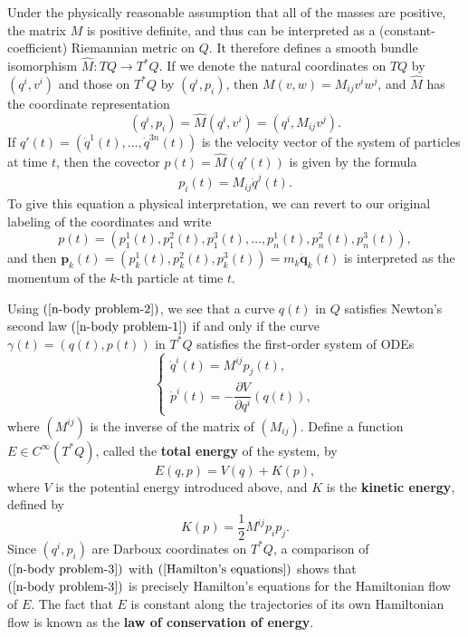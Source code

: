 \begin{example}
Under the physically reasonable assumption that all of the masses are positive, the matrix $M$ is positive definite, and thus can be interpreted as a (constant-coefficient) Riemannian metric on $Q$. It therefore defines a smooth bundle isomorphism $\widehat{M}:TQ\to T^*Q$. If we denote the natural coordinates on $TQ$ by $(q^i,v^i)$ and those on $T^*Q$ by $(q^i,p_i)$, then $M(v,w)=M_{ij}v^iw^j$, and $\widehat{M}$ has the coordinate representation
\[(q^i,p_i)=\widehat{M}(q^i,v^i)=(q^i,M_{ij}v^j).\]
If $q'(t)=(\dot{q}^1(t),\dots,\dot{q}^{3n}(t))$ is the velocity vector of the system of particles at time $t$, then the covector $p(t)=\widehat{M}(q'(t))$ is given by the formula
\begin{align}\label{n-body problem-2}
p_i(t)=M_{ij}\dot{q}^j(t).
\end{align}
To give this equation a physical interpretation, we can revert to our original labeling of the coordinates and write
\[p(t)=(p_1^1(t),p_1^2(t),p_1^3(t),\dots,p_n^1(t),p_n^2(t),p_n^3(t)),\]
and then $\mathbf{p}_k(t)=(p_k^1(t),p_k^2(t),p_k^3(t))=m_k\dot{\mathbf{q}}_k(t)$ is interpreted as the momentum of the $k$-th particle at time $t$.\par
Using $(\ref{n-body problem-2})$, we see that a curve $q(t)$ in $Q$ satisfies Newton's second law $(\ref{n-body problem-1})$ if and only if the curve $\gamma(t)=(q(t),p(t))$ in $T^*Q$ satisfies the first-order system of ODEs
\begin{equation}\label{n-body problem-3}
\left\{
\begin{array}{l}
\dot{q}^i(t)=M^{ij}p_j(t),\\[8pt]
\dot{p}^i(t)=-\dfrac{\partial V}{\partial q^i}(q(t)),
\end{array}
\right.
\end{equation}
where $(M^{ij})$ is the inverse of the matrix of $(M_{ij})$. Define a function $E\in C^\infty(T^*Q)$, called the \textbf{total energy} of the system, by
\[E(q,p)=V(q)+K(p),\]
where $V$ is the potential energy introduced above, and $K$ is the \textbf{kinetic energy}, defined by
\[K(p)=\frac{1}{2}M^{ij}p_ip_j.\]
Since $(q^i,p_i)$ are Darboux coordinates on $T^*Q$, a comparison of $(\ref{n-body problem-3})$ with $(\ref{Hamilton's equations})$ shows that $(\ref{n-body problem-3})$ is precisely Hamilton's equations for the Hamiltonian flow of $E$. The fact that $E$ is constant along the trajectories of its own Hamiltonian flow is known as the \textbf{law of conservation of energy}.
\end{example}
